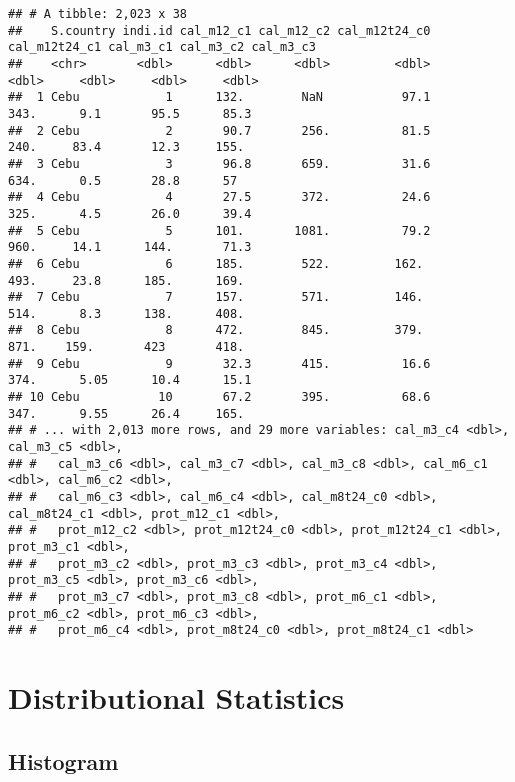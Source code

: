 \documentclass[
]{book}
\begin{document}
\begin{verbatim}
## # A tibble: 2,023 x 38
##    S.country indi.id cal_m12_c1 cal_m12_c2 cal_m12t24_c0 cal_m12t24_c1 cal_m3_c1 cal_m3_c2 cal_m3_c3
##    <chr>       <dbl>      <dbl>      <dbl>         <dbl>         <dbl>     <dbl>     <dbl>     <dbl>
##  1 Cebu            1      132.        NaN           97.1          343.      9.1       95.5      85.3
##  2 Cebu            2       90.7       256.          81.5          240.     83.4       12.3     155. 
##  3 Cebu            3       96.8       659.          31.6          634.      0.5       28.8      57  
##  4 Cebu            4       27.5       372.          24.6          325.      4.5       26.0      39.4
##  5 Cebu            5      101.       1081.          79.2          960.     14.1      144.       71.3
##  6 Cebu            6      185.        522.         162.           493.     23.8      185.      169. 
##  7 Cebu            7      157.        571.         146.           514.      8.3      138.      408. 
##  8 Cebu            8      472.        845.         379.           871.    159.       423       418. 
##  9 Cebu            9       32.3       415.          16.6          374.      5.05      10.4      15.1
## 10 Cebu           10       67.2       395.          68.6          347.      9.55      26.4     165. 
## # ... with 2,013 more rows, and 29 more variables: cal_m3_c4 <dbl>, cal_m3_c5 <dbl>,
## #   cal_m3_c6 <dbl>, cal_m3_c7 <dbl>, cal_m3_c8 <dbl>, cal_m6_c1 <dbl>, cal_m6_c2 <dbl>,
## #   cal_m6_c3 <dbl>, cal_m6_c4 <dbl>, cal_m8t24_c0 <dbl>, cal_m8t24_c1 <dbl>, prot_m12_c1 <dbl>,
## #   prot_m12_c2 <dbl>, prot_m12t24_c0 <dbl>, prot_m12t24_c1 <dbl>, prot_m3_c1 <dbl>,
## #   prot_m3_c2 <dbl>, prot_m3_c3 <dbl>, prot_m3_c4 <dbl>, prot_m3_c5 <dbl>, prot_m3_c6 <dbl>,
## #   prot_m3_c7 <dbl>, prot_m3_c8 <dbl>, prot_m6_c1 <dbl>, prot_m6_c2 <dbl>, prot_m6_c3 <dbl>,
## #   prot_m6_c4 <dbl>, prot_m8t24_c0 <dbl>, prot_m8t24_c1 <dbl>
\end{verbatim}

\hypertarget{distributional-statistics}{%
\section{Distributional Statistics}\label{distributional-statistics}}

\hypertarget{histogram}{%
\subsection{Histogram}\label{histogram}}
\end{document}
